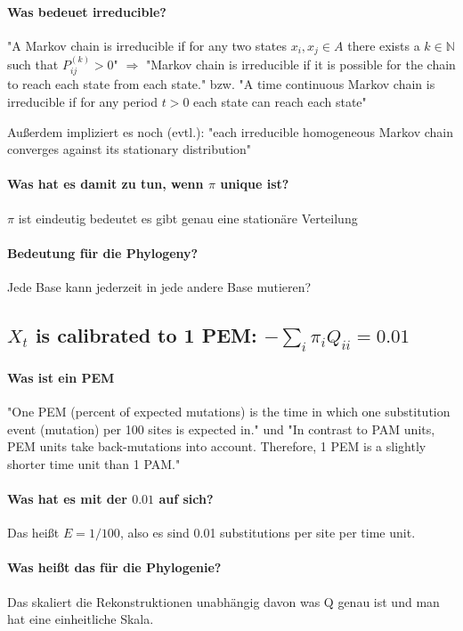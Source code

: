 \paragraph{Was bedeuet irreducible?}  "A Markov chain is irreducible if for any two states $x_i , x_j \in A$ there exists a $k \in \mathbb{N}$ such that $P_{ij}^{(k)} > 0$" $\Rightarrow$ "Markov chain is irreducible if it is possible for the chain to reach each state from each state." bzw. "A time continuous Markov chain is irreducible if for any period $t > 0$ each state can reach each state"

Außerdem impliziert es noch (evtl.): "each irreducible homogeneous Markov chain converges against its stationary distribution"

\paragraph{Was hat es damit zu tun, wenn $\pi$ unique ist?}
$\pi$ ist eindeutig bedeutet es gibt genau eine stationäre Verteilung

\paragraph{Bedeutung für die Phylogeny?}
Jede Base kann jederzeit in jede andere Base mutieren?

\subsection{$X_t$ is calibrated to 1 PEM: $- \sum_i \pi_i Q_{ii} = 0.01$}
\paragraph{Was ist ein PEM} "One PEM (percent of expected mutations) is the time in which one substitution event (mutation) per 100 sites is expected in." und "In contrast to PAM units, PEM units take back-mutations into account. Therefore, 1 PEM is a slightly shorter time unit than 1 PAM."

\paragraph{Was hat es mit der $0.01$ auf sich?}
Das heißt $E = 1/100$, also es sind 0.01 substitutions per site per time unit. 

\paragraph{Was heißt das für die Phylogenie?}
Das skaliert die Rekonstruktionen unabhängig davon was Q genau ist und man hat eine einheitliche Skala. 

